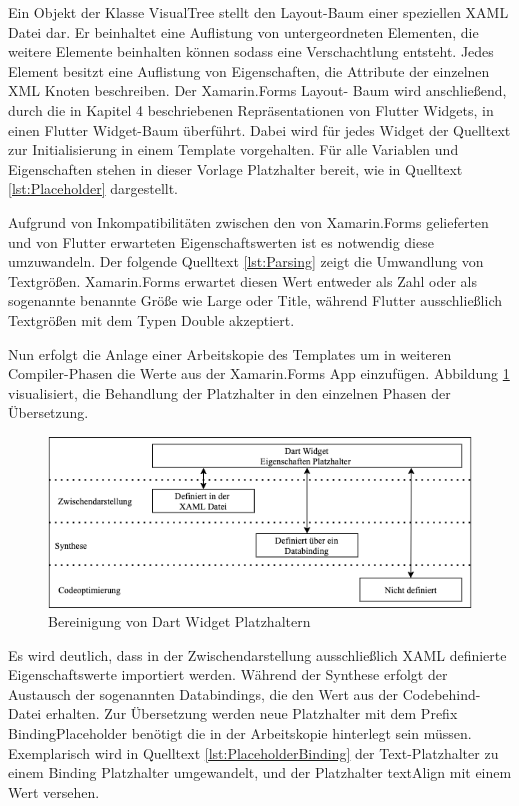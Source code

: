 Ein Objekt der Klasse VisualTree stellt den Layout-Baum einer speziellen XAML Datei dar.  Er beinhaltet eine Auflistung von untergeordneten Elementen,  die weitere Elemente beinhalten können sodass eine Verschachtlung entsteht.  Jedes Element besitzt eine Auflistung von Eigenschaften, die Attribute der einzelnen XML Knoten beschreiben.  Der Xamarin.Forms Layout- Baum wird anschließend,  durch die in Kapitel 4 beschriebenen Repräsentationen von Flutter Widgets, in einen Flutter Widget-Baum überführt.  Dabei wird für jedes Widget der Quelltext zur Initialisierung in einem Template vorgehalten.  Für alle Variablen und Eigenschaften stehen in dieser Vorlage Platzhalter bereit, wie in Quelltext \ref{lst:Placeholder} dargestellt.

 

Aufgrund von Inkompatibilitäten zwischen den von Xamarin.Forms gelieferten und von Flutter erwarteten Eigenschaftswerten ist es notwendig diese umzuwandeln.  Der folgende Quelltext \ref{lst:Parsing} zeigt die Umwandlung von Textgrößen.  Xamarin.Forms erwartet diesen Wert entweder als Zahl oder als sogenannte benannte Größe wie Large oder Title,  während Flutter ausschließlich Textgrößen mit dem Typen Double akzeptiert.   

 



Nun erfolgt die Anlage einer Arbeitskopie des Templates um in weiteren Compiler-Phasen die Werte aus der Xamarin.Forms App einzufügen.  Abbildung \ref{fig:PlaceholderOptions} visualisiert, die Behandlung der Platzhalter in den einzelnen Phasen der Übersetzung.

\begin{figure}[!ht]
 \includegraphics[width=\textwidth,keepaspectratio]{Images/Implementation/DartPlaceHolder.png}
 \caption{Bereinigung von Dart Widget Platzhaltern}
 \label{fig:PlaceholderOptions}
\end{figure}
Es wird deutlich, dass in der Zwischendarstellung ausschließlich XAML definierte Eigenschaftswerte 
importiert werden.  Während der Synthese erfolgt der Austausch der sogenannten Databindings, die den Wert aus der Codebehind-Datei erhalten.  Zur Übersetzung werden neue Platzhalter mit dem Prefix \glq BindingPlaceholder \grq{} benötigt die in der Arbeitskopie hinterlegt sein müssen. Exemplarisch wird in Quelltext  \ref{lst:PlaceholderBinding} der Text-Platzhalter zu einem Binding Platzhalter umgewandelt,  und der Platzhalter textAlign mit einem Wert versehen. 

